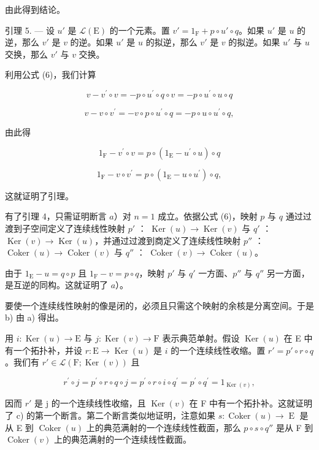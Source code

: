 由此得到结论。

引理 5. --- 设 \(u'\) 是 \(\mathcal{L}(\mathrm{E})\) 的一个元素。置 \(v' = 1_{\mathrm{F}} + p \circ u' \circ q\)。如果 \(u'\) 是 \(u\) 的逆，那么 \(v'\) 是 \(v\) 的逆。如果 \(u'\) 是 \(u\) 的拟逆，那么 \(v'\) 是 \(v\) 的拟逆。如果 \(u'\) 与 \(u\) 交换，那么 \(v'\) 与 \(v\) 交换。

利用公式 (6)，我们计算

\[
v - v ^ {\prime} \circ v = - p \circ u ^ {\prime} \circ q \circ v = - p \circ u ^ {\prime} \circ u \circ q
\]

\[
v - v \circ v ^ {\prime} = - v \circ p \circ u ^ {\prime} \circ q = - p \circ u \circ u ^ {\prime} \circ q,
\]

由此得

\[
1 _ {\mathrm{F}} - v ^ {\prime} \circ v = p \circ (1 _ {\mathrm{E}} - u ^ {\prime} \circ u) \circ q
\]

\[
1 _ {\mathrm{F}} - v \circ v ^ {\prime} = p \circ (1 _ {\mathrm{E}} - u \circ u ^ {\prime}) \circ q,
\]

这就证明了引理。

有了引理 4，只需证明断言 \(a\)）对 \(n = 1\) 成立。依据公式 (6)，映射 \(p\) 与 \(q\) 通过过渡到子空间定义了连续线性映射 \(p'\) ： \(\operatorname{Ker}(u) \to \operatorname{Ker}(v)\) 与 \(q'\) ： \(\operatorname{Ker}(v) \to \operatorname{Ker}(u)\)，并通过过渡到商定义了连续线性映射 \(p''\) ： \(\operatorname{Coker}(u) \to \operatorname{Coker}(v)\) 与 \(q''\) ： \(\operatorname{Coker}(v) \to \operatorname{Coker}(u)\)。

由于 \(1_{\mathrm{E}} - u = q \circ p\) 且 \(1_{\mathrm{F}} - v = p \circ q\)，映射 \(p'\) 与 \(q'\) 一方面、\(p''\) 与 \(q''\) 另一方面，是互逆的同构。这就证明了 \(a\)）。

要使一个连续线性映射的像是闭的，必须且只需这个映射的余核是分离空间。于是 b) 由 a) 得出。

用 \(i\colon \operatorname{Ker}(u)\to \mathrm{E}\) 与 \(j\colon \operatorname{Ker}(v)\to \mathrm{F}\) 表示典范单射。假设 \(\operatorname{Ker}(u)\) 在 E 中有一个拓扑补，并设 \(r\colon \mathrm{E}\to \operatorname{Ker}(u)\) 是 \(i\) 的一个连续线性收缩。置 \(r' = p'\circ r\circ q\)。我们有 \(r'\in \mathcal{L}(\mathrm{F};\operatorname {Ker}(v))\) 且

\[
r ^ {\prime} \circ j = p ^ {\prime} \circ r \circ q \circ j = p ^ {\prime} \circ r \circ i \circ q ^ {\prime} = p ^ {\prime} \circ q ^ {\prime} = 1 _ {\operatorname{Ker} (v)},
\]

因而 \(r'\) 是 j 的一个连续线性收缩，且 \(\operatorname{Ker}(v)\) 在 F 中有一个拓扑补。这就证明了 c) 的第一个断言。第二个断言类似地证明，注意如果 \(s: \operatorname{Coker}(u) \to \operatorname{E}\) 是从 E 到 \(\operatorname{Coker}(u)\) 上的典范满射的一个连续线性截面，那么 \(p \circ s \circ q''\) 是从 F 到 \(\operatorname{Coker}(v)\) 上的典范满射的一个连续线性截面。

